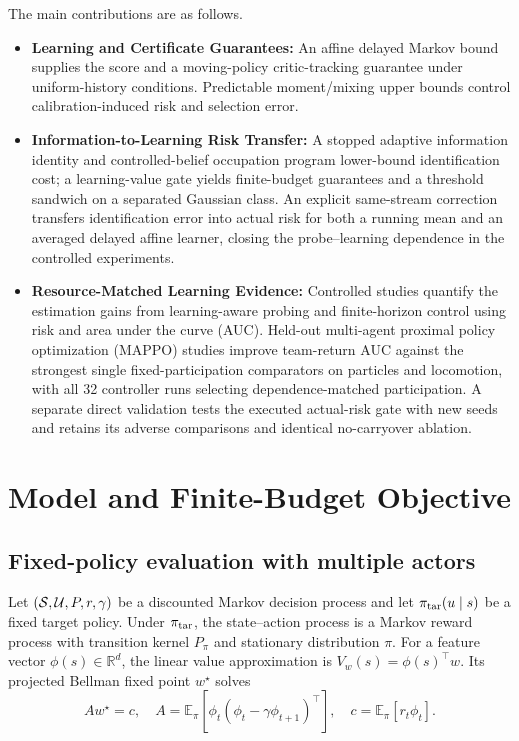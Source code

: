 \documentclass[journal]{IEEEtran}
\newcommand{\E}{\mathbb{E}}
\newcommand{\R}{\mathbb{R}}
\begin{document}
The main contributions are as follows.
\begin{itemize}
\item \textbf{Learning and Certificate Guarantees:} An affine delayed Markov bound supplies the score and a moving-policy critic-tracking guarantee under uniform-history conditions.
Predictable moment/mixing upper bounds control calibration-induced risk and selection error.
\item \textbf{Information-to-Learning Risk Transfer:} A stopped adaptive information identity and controlled-belief occupation program lower-bound identification cost; a learning-value gate yields finite-budget guarantees and a threshold sandwich on a separated Gaussian class.
An explicit same-stream correction transfers identification error into actual risk for both a running mean and an averaged delayed affine learner, closing the probe--learning dependence in the controlled experiments.
\item \textbf{Resource-Matched Learning Evidence:} Controlled studies quantify the estimation gains from learning-aware probing and finite-horizon control using risk and area under the curve (AUC).
Held-out multi-agent proximal policy optimization (MAPPO) studies improve team-return AUC against the strongest single fixed-participation comparators on particles and locomotion, with all 32 controller runs selecting dependence-matched participation.
A separate direct validation tests the executed actual-risk gate with new seeds and retains its adverse comparisons and identical no-carryover ablation.
\end{itemize}

\section{Model and Finite-Budget Objective}
\subsection{Fixed-policy evaluation with multiple actors}
Let $({\cal S},{\cal U},P,r,\gamma)$ be a discounted Markov decision process and let $\pi_{\rm tar}(u\mid s)$ be a fixed target policy.
Under $\pi_{\rm tar}$, the state--action process is a Markov reward process with transition kernel $P_{\pi}$ and stationary distribution $\pi$.
For a feature vector $\phi(s)\in\R^d$, the linear value approximation is $V_w(s)=\phi(s)^\top w$.
Its projected Bellman fixed point $w^\star$ solves
\begin{equation}
A w^\star=c,
\quad
A=\E_\pi[\phi_t(\phi_t-\gamma\phi_{t+1})^\top],
\quad
c=\E_\pi[r_t\phi_t].
\label{eq:projected-fixed-point}
\end{equation}
\end{document}
